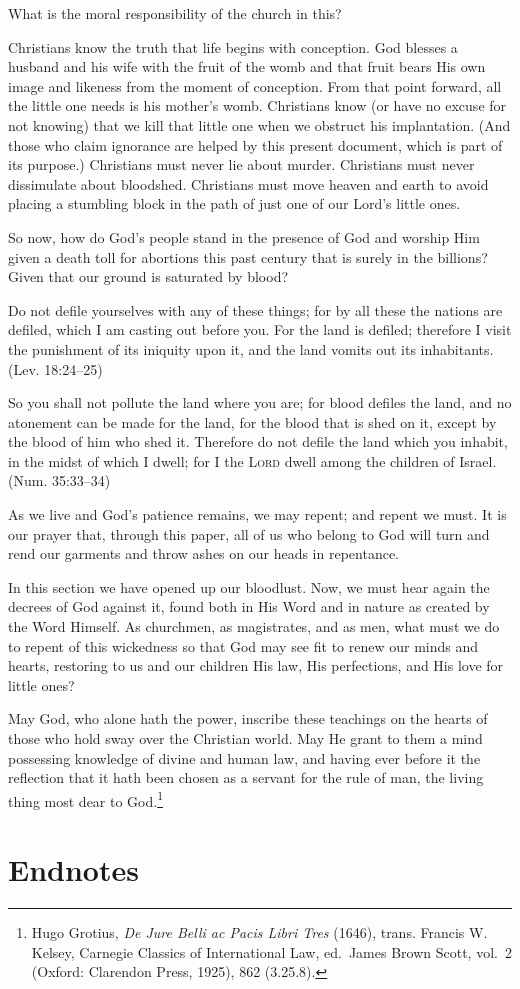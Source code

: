 \documentclass[
]{book}
\begin{document}
What is the moral responsibility of the church in this?

Christians know the truth that life begins with conception. God blesses a husband and his wife with the fruit of the womb and that fruit bears His own image and likeness from the moment of conception. From that point forward, all the little one needs is his mother's womb. Christians know (or have no excuse for not knowing) that we kill that little one when we obstruct his implantation. (And those who claim ignorance are helped by this present document, which is part of its purpose.) Christians must never lie about murder. Christians must never dissimulate about bloodshed. Christians must move heaven and earth to avoid placing a stumbling block in the path of just one of our Lord's little ones.

So now, how do God's people stand in the presence of God and worship Him given a death toll for abortions this past century that is surely in the billions? Given that our ground is saturated by blood?

Do not defile yourselves with any of these things; for by all these the nations are defiled, which I am casting out before you. For the land is defiled; therefore I visit the punishment of its iniquity upon it, and the land vomits out its inhabitants. (Lev. 18:24--25)

So you shall not pollute the land where you are; for blood defiles the land, and no atonement can be made for the land, for the blood that is shed on it, except by the blood of him who shed it. Therefore do not defile the land which you inhabit, in the midst of which I dwell; for I the \textsc{Lord} dwell among the children of Israel. (Num. 35:33--34)

As we live and God's patience remains, we may repent; and repent we must. It is our prayer that, through this paper, all of us who belong to God will turn and rend our garments and throw ashes on our heads in repentance.

In this section we have opened up our bloodlust. Now, we must hear again the decrees of God against it, found both in His Word and in nature as created by the Word Himself. As churchmen, as magistrates, and as men, what must we do to repent of this wickedness so that God may see fit to renew our minds and hearts, restoring to us and our children His law, His perfections, and His love for little ones?

May God, who alone hath the power, inscribe these teachings on the hearts of those who hold sway over the Christian world. May He grant to them a mind possessing knowledge of divine and human law, and having ever before it the reflection that it hath been chosen as a servant for the rule of man, the living thing most dear to God.\footnote{Hugo Grotius, \emph{De Jure Belli ac Pacis Libri Tres} (1646), trans. Francis W. Kelsey, Carnegie Classics of International Law, ed.~James Brown Scott, vol.~2 (Oxford: Clarendon Press, 1925), 862 (3.25.8).}

\hypertarget{endnotes}{%
\chapter{Endnotes}\label{endnotes}}
\end{document}
